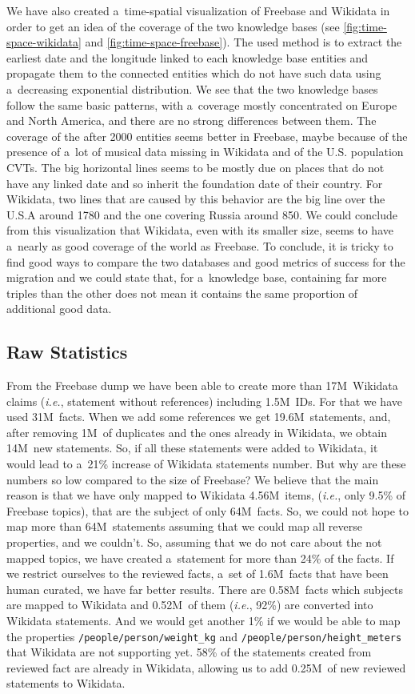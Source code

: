 \documentclass{sig-alternate}
\begin{document}
We have also created a~time-spatial visualization of Freebase and Wikidata in order
to get an idea of the coverage of the two knowledge bases
(see \autoref{fig:time-space-wikidata} and \autoref{fig:time-space-freebase}).
The used method is to extract the earliest date and the longitude
linked to each knowledge base entities
and propagate them to the connected entities which do not have such data
using a~decreasing exponential distribution.
We see that the two knowledge bases follow the same basic patterns,
with a~coverage mostly concentrated on Europe and North America,
and there are no strong differences between them.
The coverage of the after 2000 entities seems better in Freebase, maybe because of
the presence of a~lot of musical data missing in Wikidata and of the U.S.
population CVTs.
The big horizontal lines seems to be mostly due on places that do not have any linked date
and so inherit the foundation date of their country.
For Wikidata, two lines that are caused by this behavior are the big line over the U.S.A around 1780
and the one covering Russia around 850.
We could conclude from this visualization that Wikidata, even with its smaller size,
seems to have a~nearly as good coverage of the world as Freebase.
To conclude, it is tricky to find good ways to compare the two databases
and good metrics of success for the migration and we could state that, for a~knowledge base,
containing far more triples than the other does not mean
it contains the same proportion of additional good data.

\subsection{Raw Statistics}

From the Freebase dump we have been able to create more than 17M~Wikidata claims
(\emph{i.e.}, statement without references) including 1.5M~IDs.
For that we have used 31M~facts.
When we add some references we get 19.6M~statements, and, after removing 1M~of duplicates
and the ones already in Wikidata, we obtain 14M~new statements.
So, if all these statements were added to Wikidata,
it would lead to a~21\% increase of Wikidata statements number.
But why are these numbers so low compared to the size of Freebase?
We believe that the main reason is that we have only mapped to Wikidata 4.56M~items, (\emph{i.e.},
only 9.5\% of Freebase topics), that are the subject of only 64M~facts.
So, we could not hope to map more than 64M~statements
assuming that we could map all reverse properties, and we couldn't.
So, assuming that we do not care about the not mapped topics,
we have created a~statement for more than 24\% of the facts.
If we restrict ourselves to the reviewed facts, a~set of 1.6M~facts
that have been human curated, we have far better results.
There are 0.58M~facts which subjects are mapped to Wikidata and 0.52M~of them
(\emph{i.e.}, 92\%) are converted into Wikidata statements.
And we would get another 1\% if we would be able
to map the properties \texttt{/people/person/weight\_kg}
and \texttt{/people/person/height\_meters} that Wikidata are not supporting yet.
58\% of the statements created from reviewed fact are already in Wikidata,
allowing us to add 0.25M~of new reviewed statements to Wikidata.
\end{document}
